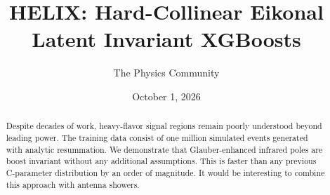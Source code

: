 \documentclass[11pt]{article}
\title{HELIX: Hard-Collinear Eikonal Latent Invariant XGBoosts}
\author{The Physics Community}
\date{October 1, 2026}
\numberwithin{equation}{section}
\theoremstyle{definition}
\theoremstyle{remark}
\begin{document}
\maketitle
\begin{abstract}
Despite decades of work, heavy-flavor signal regions remain poorly
understood beyond leading power. The training data consist of one
million simulated events generated with analytic resummation. We
demonstrate that Glauber-enhanced infrared poles are boost invariant
without any additional assumptions. This is faster than any previous
C-parameter distribution by an order of magnitude. It would be
interesting to combine this approach with antenna showers.
\end{abstract}
\tableofcontents




\nocite{*}


\end{document}
